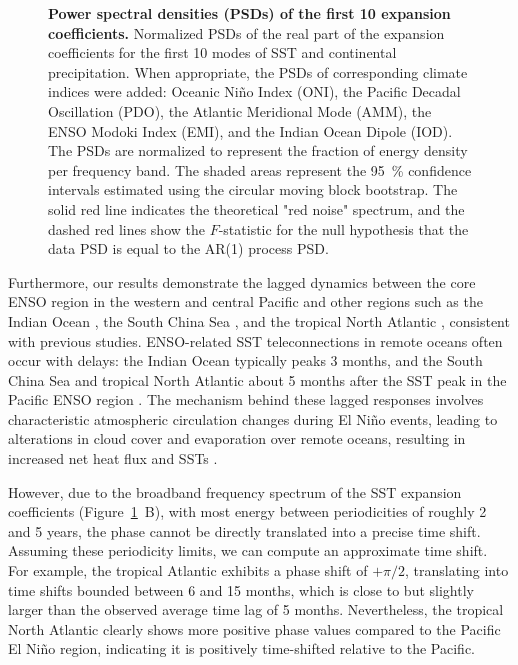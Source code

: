 \begin{figure}
    \centering
    \caption[Power spectral densities (PSDs) of the first 10 expansion coefficients.]{\textbf{Power spectral densities (PSDs) of the first 10 expansion coefficients.} Normalized PSDs of the real part of the expansion coefficients for the first 10 modes of SST and continental precipitation.  When appropriate, the PSDs of corresponding climate indices were added: Oceanic Niño Index (ONI), the Pacific Decadal Oscillation (PDO), the Atlantic Meridional Mode (AMM), the ENSO Modoki Index (EMI), and the Indian Ocean Dipole (IOD). The PSDs are normalized to represent the fraction of energy density per frequency band. The shaded areas represent the \qty{95}{\percent} confidence intervals estimated using the circular moving block bootstrap. The solid red line indicates the theoretical "red noise" spectrum, and the dashed red lines show the $F$-statistic for the null hypothesis that the data PSD is equal to the AR(1) process PSD.}
    \label{fig:tele:psd}
\end{figure}


Furthermore, our results demonstrate the lagged dynamics between the core ENSO region in the western and central Pacific and other regions such as the Indian Ocean \cite{krishnamurthy_variability_2003}, the South China Sea \cite{klein_remote_1999}, and the tropical North Atlantic \cite{enfield_tropical_1997, saravanan_interaction_2000, alexander_influence_2002, chiang_tropical_2002}, consistent with previous studies. ENSO-related SST teleconnections in remote oceans often occur with delays: the Indian Ocean typically peaks 3 months, and the South China Sea and tropical North Atlantic about 5 months after the SST peak in the Pacific ENSO region \cite{enfield_tropical_1997, klein_remote_1999, saravanan_interaction_2000}. The mechanism behind these lagged responses involves characteristic atmospheric circulation changes during El Niño events, leading to alterations in cloud cover and evaporation over remote oceans, resulting in increased net heat flux and SSTs \cite{lau_role_1996, klein_remote_1999}.

However, due to the broadband frequency spectrum of the SST expansion coefficients (Figure~\ref{fig:tele:psd}~B), with most energy between periodicities of roughly 2 and 5 years, the phase cannot be directly translated into a precise time shift. Assuming these periodicity limits, we can compute an approximate time shift. For example, the tropical Atlantic exhibits a phase shift of $+\pi/2$, translating into time shifts bounded between 6 and 15 months, which is close to but slightly larger than the observed average time lag of 5 months. Nevertheless, the tropical North Atlantic clearly shows more positive phase values compared to the Pacific El Niño region, indicating it is positively time-shifted relative to the Pacific.


